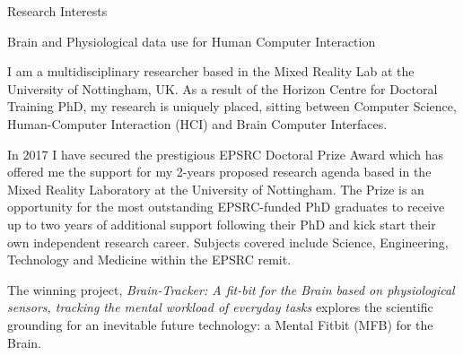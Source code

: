 \documentclass{resume} %
\begin{document}
\begin{rSection}{Research Interests}
\begin{rSubsection}{Brain and Physiological data use for Human Computer Interaction}{ }{ }{ }
\vspace{-5 mm}

I am a multidisciplinary researcher based in the Mixed Reality Lab at the University of Nottingham, UK. As a result of the Horizon Centre for Doctoral Training PhD, my research is uniquely placed, sitting between Computer Science, Human-Computer Interaction (HCI) and Brain Computer Interfaces. 

In 2017 I have secured the prestigious EPSRC Doctoral Prize Award which has offered me the support for my 2-years proposed research agenda based in the Mixed Reality Laboratory at the University of Nottingham. The Prize is an opportunity for the most outstanding EPSRC-funded PhD graduates to receive up to two years of additional support following their PhD and kick start their own independent research career. Subjects covered include Science, Engineering, Technology and Medicine within the EPSRC remit.

 The winning project, \textit{Brain-Tracker: A fit-bit for the Brain based on physiological sensors, tracking the mental workload of everyday tasks} explores the scientific grounding for an inevitable future technology: a Mental Fitbit (MFB) for the Brain.



\end{rSubsection}
\end{rSection}
\end{document}
